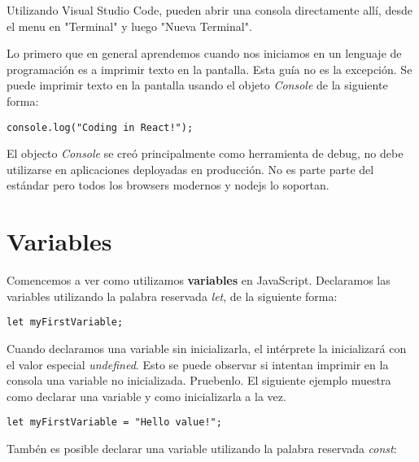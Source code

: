 \documentclass[a4paper, oneside, titlepage, 12pt]{book}
\begin{document}
Utilizando Visual Studio Code, pueden abrir una consola directamente allí, desde el menu en "Terminal" y luego "Nueva Terminal". 
\newline

Lo primero que en general aprendemos cuando nos iniciamos en un lenguaje de programación es a imprimir texto en la pantalla. Esta guía no es la excepción. Se puede imprimir texto en la pantalla usando el objeto \textit{Console} de la siguiente forma:

\begin{verbatim}
console.log("Coding in React!");
\end{verbatim}

El objecto \textit{Console} se creó principalmente como herramienta de debug, no debe utilizarse en aplicaciones deployadas en producción. No es parte parte del estándar pero todos los browsers modernos y nodejs lo soportan.
\newline

\section{Variables}

Comencemos a ver como utilizamos \textbf{variables} en JavaScript. Declaramos las variables utilizando la palabra reservada \textit{let}, de la siguiente forma:

\begin{verbatim}
let myFirstVariable;
\end{verbatim}

Cuando declaramos una variable sin inicializarla, el intérprete la inicializará con el valor especial \textit{undefined}. Esto se puede observar si intentan imprimir en la consola una variable no inicializada. Pruebenlo. El siguiente ejemplo muestra como declarar una variable y como inicializarla a la vez.

\begin{verbatim}
let myFirstVariable = "Hello value!";
\end{verbatim}

Tambén es posible declarar una variable utilizando la palabra reservada \textit{const}:
\end{document}
